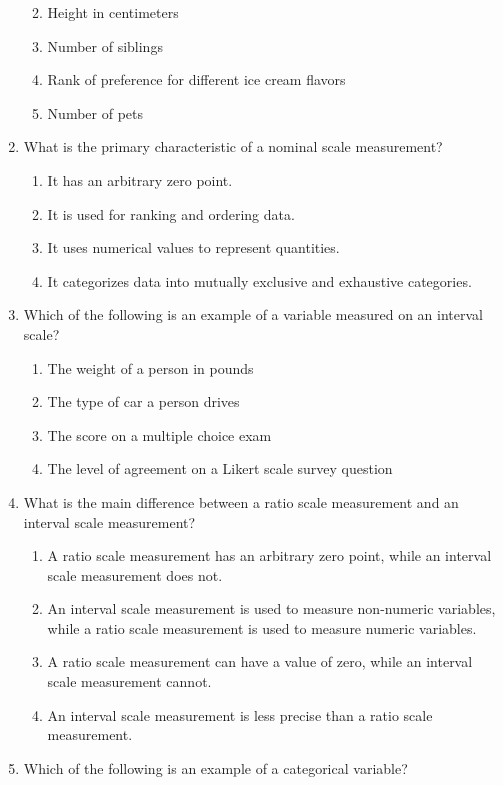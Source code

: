 \documentclass[
]{book}
\begin{document}
\begin{enumerate}
  \begin{enumerate}
  \def\labelenumii{\alph{enumii}.}
  \item
    Height in centimeters
  \item
    Number of siblings
  \item
    Rank of preference for different ice cream flavors
  \item
    Number of pets
  \end{enumerate}
\item
  What is the primary characteristic of a nominal scale measurement?

  \begin{enumerate}
  \def\labelenumii{\alph{enumii}.}
  \item
    It has an arbitrary zero point.
  \item
    It is used for ranking and ordering data.
  \item
    It uses numerical values to represent quantities.
  \item
    It categorizes data into mutually exclusive and exhaustive
    categories.
  \end{enumerate}
\item
  Which of the following is an example of a variable measured on an
  interval scale?

  \begin{enumerate}
  \def\labelenumii{\alph{enumii}.}
  \item
    The weight of a person in pounds
  \item
    The type of car a person drives
  \item
    The score on a multiple choice exam
  \item
    The level of agreement on a Likert scale survey question
  \end{enumerate}
\item
  What is the main difference between a ratio scale measurement and an
  interval scale measurement?

  \begin{enumerate}
  \def\labelenumii{\alph{enumii}.}
  \item
    A ratio scale measurement has an arbitrary zero point, while an
    interval scale measurement does not.
  \item
    An interval scale measurement is used to measure non-numeric
    variables, while a ratio scale measurement is used to measure
    numeric variables.
  \item
    A ratio scale measurement can have a value of zero, while an
    interval scale measurement cannot.
  \item
    An interval scale measurement is less precise than a ratio scale
    measurement.
  \end{enumerate}
\item
  Which of the following is an example of a categorical variable?


\end{enumerate}
\end{document}
